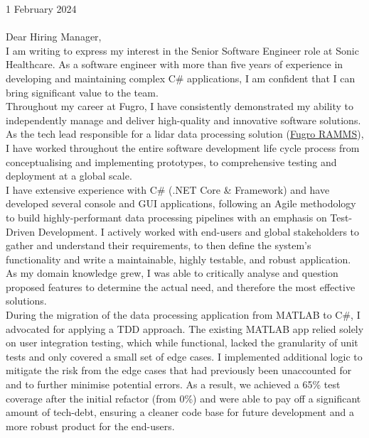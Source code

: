 \vspace{30pt}

1 February 2024 \\ \\

Dear Hiring Manager, \\

I am writing to express my interest in the Senior Software Engineer role at Sonic Healthcare. As a software engineer with more than five years of experience in developing and maintaining complex C\# applications, I am confident that I can bring significant value to the team. \\

Throughout my career at Fugro, I have consistently demonstrated my ability to independently manage and deliver high-quality and innovative software solutions. As the tech lead responsible for a lidar data processing solution (\href{https://www.youtube.com/watch?v=f65bdm4tous}{\underline{Fugro RAMMS}}), I have worked throughout the entire software development life cycle process from conceptualising and implementing prototypes, to comprehensive testing and deployment at a global scale. \\

I have extensive experience with C\# (.NET Core \& Framework) and have developed several console and GUI applications, following an Agile methodology to build highly-performant data processing pipelines with an emphasis on Test-Driven Development. I actively worked with end-users and global stakeholders to gather and understand their requirements, to then define the system's functionality and write a maintainable, highly testable, and robust application. As my domain knowledge grew, I was able to critically analyse and question proposed features to determine the actual need, and therefore the most effective solutions. \\

During the migration of the data processing application from MATLAB to C\#, I advocated for applying a TDD approach. The existing MATLAB app relied solely on user integration testing, which while functional, lacked the granularity of unit tests and only covered a small set of edge cases. I implemented additional logic to mitigate the risk from the edge cases that had previously been unaccounted for and to further minimise potential errors. As a result, we achieved a 65\% test coverage after the initial refactor (from 0\%) and were able to pay off a significant amount of tech-debt, ensuring a cleaner code base for future development and a more robust product for the end-users.\\

